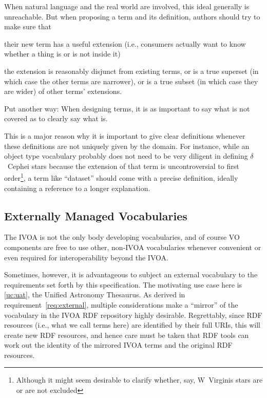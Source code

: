 \documentclass[11pt,a4paper]{ivoa}
\begin{document}
When natural language and the real world are involved, 
this ideal generally is unreachable.
But when proposing a term and its definition, authors should try to
make sure that 

\begin{compactenum}
\item their new term has a useful extension (i.e., consumers actually
want to know whether a thing is or is not inside it)
\item the extension is reasonably disjunct from existing terms, or is a
true superset (in which case the other terms are narrower), or is a true
subset (in which case they are wider) of other terms' extensions.
\end{compactenum}

Put another way: When designing terms, it is as important to say what is
not covered as to clearly say what is.

This is a major reason why it is important to give clear definitions
whenever these definitions are not uniquely given by the domain.  For
instance, while an object type vocabulary probably does not need to be
very diligent in defining $\delta$~Cephei stars because the extension of
that term is uncontroversial to first order\footnote{Although it might
seem desirable to clarify whether, say, W~Virginis stars are or are not
excluded}, a term like ``dataset'' should come with a precise
definition, ideally containing a reference to a longer explanation.

\subsection{Externally Managed Vocabularies}
\label{sect:externally-managed}

The IVOA is not the only body developing vocabularies, and of course VO
components are free to use other, non-IVOA vocabularies whenever
convenient or even required for interoperability beyond the IVOA.

Sometimes, however, it is advantageous to subject an external vocabulary
to the requirements set forth by this specification.  The motivating use
case here is \ref{uc:uat}, the Unified Astronomy Thesaurus.  As derived
in requirement~\ref{req:external}, multiple considerations make a
``mirror'' of the vocabulary in the IVOA RDF repository highly
desirable.  Regrettably, since RDF resources (i.e., what we call terms
here) are identified by their full URIs, this will create new RDF
resources, and hence care must be taken that RDF tools can work out the
identity of the mirrored IVOA terms and the original RDF resources.
\end{document}
